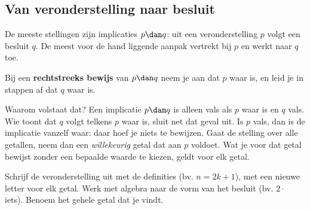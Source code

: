 \subsection{Van veronderstelling naar besluit}

De meeste stellingen zijn implicaties $p \dan q$: uit een veronderstelling $p$ volgt een besluit $q$. De meest voor de hand liggende aanpak vertrekt bij $p$ en werkt naar $q$ toe.

\begin{theorie}
Bij een \textbf{\textcolor{accent}{rechtstreeks bewijs}} van $p \dan q$ neem je aan dat $p$ waar is, en leid je in stappen af dat $q$ waar is.
\end{theorie}

Waarom volstaat dat? Een implicatie $p \dan q$ is alleen vals als $p$ waar is en $q$ vals. Wie toont dat $q$ volgt telkens $p$ waar is, sluit net dat geval uit. Is $p$ vals, dan is de implicatie vanzelf waar: daar hoef je niets te bewijzen. Gaat de stelling over alle getallen, neem dan een \textit{willekeurig} getal dat aan $p$ voldoet. Wat je voor dat getal bewijst zonder een bepaalde waarde te kiezen, geldt voor elk getal.


\begin{werkwijze}
Schrijf de veronderstelling uit met de definities (bv. $n = 2k + 1$), met een nieuwe letter voor elk getal. Werk met algebra naar de vorm van het besluit (bv. $2 \cdot$ iets). Benoem het gehele getal dat je vindt.
\end{werkwijze}

\begin{oefeningen}
\end{oefeningen}

